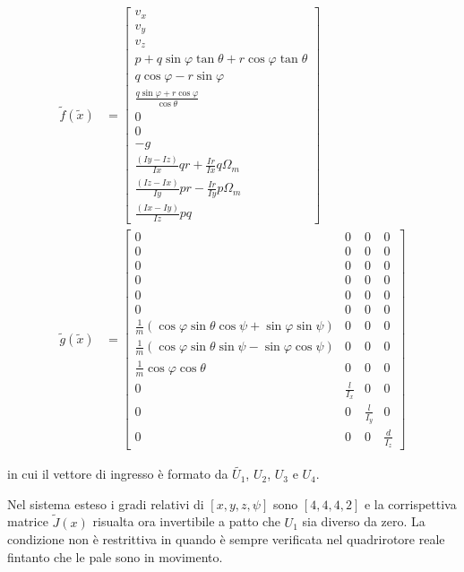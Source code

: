 \documentclass[a4paper,10pt]{article}
\begin{document}
\begin{equation}\begin{split}
\tilde{f}(\tilde{x}) &= \begin{bmatrix} v_x\\                                              
    v_y\\                                                
    v_z\\                                                 
    p+q\sin\varphi\tan\theta +r\cos\varphi\tan\theta\\        
    q\cos\varphi-r\sin\varphi\\                            
    \frac {q\sin\varphi+ r \cos\varphi}{\cos \theta}\\            
    0 \\
    0 \\
    -g \\                      
    \frac{(Iy-Iz)}{Ix}qr + \frac{Ir}{Ix}q\Omega_m\\                   
    \frac{(Iz-Ix)}{Iy}pr - \frac{Ir}{Iy}p\Omega_m\\                    
    \frac{(Ix-Iy)}{Iz}pq 
    \end{bmatrix}\\
    \tilde{g}(\tilde{x}) &= \begin{bmatrix} 0&0&0&0\\ 0&0&0&0\\ 0&0&0&0\\ 0&0&0&0\\ 0&0&0&0\\ 0&0&0&0\\        \frac{1}{m}(\cos \varphi\sin \theta\cos \psi+\sin \varphi\sin\psi)&0&0&0\\ \frac{1}{m}(\cos \varphi\sin \theta\sin \psi-\sin \varphi\cos \psi)&0&0&0\\ \frac{1}{m}\cos \varphi\cos \theta&0&0&0\\ 0&\frac{l}{I_x}&0&0\\ 0&0&\frac{l}{I_y}&0\\ 0&0&0&\frac{d}{I_z} \end{bmatrix} 
\end{split}\end{equation}

 in cui il vettore di ingresso è formato da $\tilde{U_1}$, $U_2$, $U_3$ e $U_4$.

Nel sistema esteso i gradi relativi di $[x,y,z,\psi]$ sono $[4,4,4,2]$ e la corrispettiva matrice $\tilde{J}(x)$ risualta ora invertibile a patto che $U_1$ sia diverso da zero. La condizione non è restrittiva in quando è sempre verificata nel quadrirotore reale fintanto che le pale sono in movimento.
\end{document}
